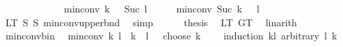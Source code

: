 \begin{isabellebody}
\ \ \ \ \ \ \ \ \ \ \ \ {\isachargreater}{\kern0pt}\ min{\isacharunderscore}{\kern0pt}conv\ {\isacharparenleft}{\kern0pt}k\ {\isacharplus}{\kern0pt}\ {}{\isacharparenright}{\kern0pt}\ {\isacharparenleft}{\kern0pt}Suc\ {\isacharparenleft}{\kern0pt}l\ {\isacharplus}{\kern0pt}\ {}{\isacharparenright}{\kern0pt}{\isacharparenright}{\kern0pt}\ {\isacharminus}{\kern0pt}\ {}\ {\isacharplus}{\kern0pt}\ {\isacharparenleft}{\kern0pt}min{\isacharunderscore}{\kern0pt}conv\ {\isacharparenleft}{\kern0pt}Suc\ {\isacharparenleft}{\kern0pt}k\ {\isacharplus}{\kern0pt}\ {}{\isacharparenright}{\kern0pt}{\isacharparenright}{\kern0pt}\ {\isacharparenleft}{\kern0pt}l\ {\isacharplus}{\kern0pt}\ {}{\isacharparenright}{\kern0pt}\ {\isacharminus}{\kern0pt}\ {}{\isacharparenright}{\kern0pt}{\isachardoublequoteclose}\isanewline
\ \ \ \ \ \ \isamarkupfalse%
\ LT{\isacharparenleft}{\kern0pt}{}{\isacharparenright}{\kern0pt}\ S{}\ S{}\ min{\isacharunderscore}{\kern0pt}conv{\isacharunderscore}{\kern0pt}upper{\isacharunderscore}{\kern0pt}bnd\ \isamarkupfalse%
\ simp\isanewline
\ \ \ \ \isamarkupfalse%
\ {\isacharquery}{\kern0pt}thesis\ \isamarkupfalse%
\ LT\ GT\ \isamarkupfalse%
\ linarith\isanewline
\ \ \isamarkupfalse%
\ \isanewline
{}\isamarkupfalse%
%
\endisatagproof
{\isafoldproof}%
%
\isadelimproof
\isanewline
%
\endisadelimproof
\isanewline
{}\isamarkupfalse%
\ min{\isacharunderscore}{\kern0pt}conv{\isacharunderscore}{\kern0pt}bin{\isacharcolon}{\kern0pt}\isanewline
\ \ {\isachardoublequoteopen}min{\isacharunderscore}{\kern0pt}conv\ {\isacharparenleft}{\kern0pt}k{\isacharplus}{\kern0pt}{}{\isacharparenright}{\kern0pt}\ {\isacharparenleft}{\kern0pt}l{\isacharplus}{\kern0pt}{}{\isacharparenright}{\kern0pt}\ {\isacharequal}{\kern0pt}\ {\isacharparenleft}{\kern0pt}{\isacharparenleft}{\kern0pt}k\ {\isacharplus}{\kern0pt}\ l\ {\isacharplus}{\kern0pt}\ {}{\isacharparenright}{\kern0pt}\ choose\ {\isacharparenleft}{\kern0pt}k\ {\isacharplus}{\kern0pt}\ {}{\isacharparenright}{\kern0pt}{\isacharparenright}{\kern0pt}\ {\isacharplus}{\kern0pt}\ {}{\isachardoublequoteclose}\isanewline
%
\isadelimproof
%
\endisadelimproof
%
\isatagproof
{}\isamarkupfalse%
{\isacharparenleft}{\kern0pt}induction\ {\isachardoublequoteopen}k{\isacharplus}{\kern0pt}l{\isachardoublequoteclose}\ arbitrary{\isacharcolon}{\kern0pt}\ l\ k{\isacharparenright}{\kern0pt}\isanewline

\end{isabellebody}
